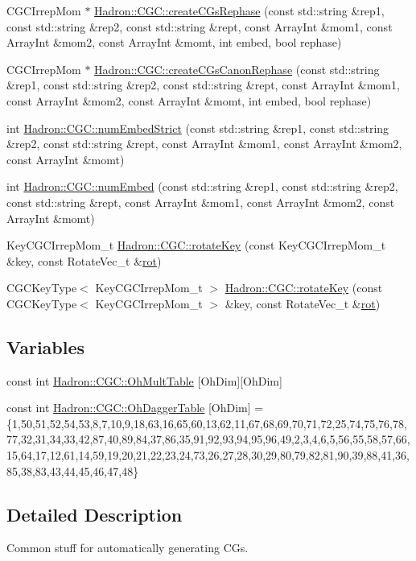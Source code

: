 \begin{DoxyCompactItemize}
\item 
C\+G\+C\+Irrep\+Mom $\ast$ \mbox{\hyperlink{namespaceHadron_1_1CGC_acb590dcbf6bd9f515f07a8e64aa76c0b}{Hadron\+::\+C\+G\+C\+::create\+C\+Gs\+Rephase}} (const std\+::string \&rep1, const std\+::string \&rep2, const std\+::string \&rept, const Array\+Int \&mom1, const Array\+Int \&mom2, const Array\+Int \&momt, int embed, bool rephase)
\item 
C\+G\+C\+Irrep\+Mom $\ast$ \mbox{\hyperlink{namespaceHadron_1_1CGC_a47b736ab1ac22edb39f4b0df589a7053}{Hadron\+::\+C\+G\+C\+::create\+C\+Gs\+Canon\+Rephase}} (const std\+::string \&rep1, const std\+::string \&rep2, const std\+::string \&rept, const Array\+Int \&mom1, const Array\+Int \&mom2, const Array\+Int \&momt, int embed, bool rephase)
\item 
int \mbox{\hyperlink{namespaceHadron_1_1CGC_af5aac6c0d70eb7159aa635525bac7629}{Hadron\+::\+C\+G\+C\+::num\+Embed\+Strict}} (const std\+::string \&rep1, const std\+::string \&rep2, const std\+::string \&rept, const Array\+Int \&mom1, const Array\+Int \&mom2, const Array\+Int \&momt)
\item 
int \mbox{\hyperlink{namespaceHadron_1_1CGC_af727ac6be27b471bc40b4696c2a29cdb}{Hadron\+::\+C\+G\+C\+::num\+Embed}} (const std\+::string \&rep1, const std\+::string \&rep2, const std\+::string \&rept, const Array\+Int \&mom1, const Array\+Int \&mom2, const Array\+Int \&momt)
\item 
Key\+C\+G\+C\+Irrep\+Mom\+\_\+t \mbox{\hyperlink{namespaceHadron_1_1CGC_acdc26e4dd88e281dc6675da8d6d1b13d}{Hadron\+::\+C\+G\+C\+::rotate\+Key}} (const Key\+C\+G\+C\+Irrep\+Mom\+\_\+t \&key, const Rotate\+Vec\+\_\+t \&\mbox{\hyperlink{rot__mat_8cc_a1db2ab3d82c6029ee441423308802a74}{rot}})
\item 
C\+G\+C\+Key\+Type$<$ Key\+C\+G\+C\+Irrep\+Mom\+\_\+t $>$ \mbox{\hyperlink{namespaceHadron_1_1CGC_ad5f1f6f8b8dd82238f3efeb03d1dc6e5}{Hadron\+::\+C\+G\+C\+::rotate\+Key}} (const C\+G\+C\+Key\+Type$<$ Key\+C\+G\+C\+Irrep\+Mom\+\_\+t $>$ \&key, const Rotate\+Vec\+\_\+t \&\mbox{\hyperlink{rot__mat_8cc_a1db2ab3d82c6029ee441423308802a74}{rot}})
\end{DoxyCompactItemize}
\subsection*{Variables}
\begin{DoxyCompactItemize}
\item 
const int \mbox{\hyperlink{namespaceHadron_1_1CGC_a1d8567cc768ec6fc24e3b51fbe4b024d}{Hadron\+::\+C\+G\+C\+::\+Oh\+Mult\+Table}} \mbox{[}Oh\+Dim\mbox{]}\mbox{[}Oh\+Dim\mbox{]}
\item 
const int \mbox{\hyperlink{namespaceHadron_1_1CGC_a1eb370ef84af334291e2488ffea2c979}{Hadron\+::\+C\+G\+C\+::\+Oh\+Dagger\+Table}} \mbox{[}Oh\+Dim\mbox{]} = \{1,50,51,52,54,53,8,7,10,9,18,63,16,65,60,13,62,11,67,68,69,70,71,72,25,74,75,76,78,77,32,31,34,33,42,87,40,89,84,37,86,35,91,92,93,94,95,96,49,2,3,4,6,5,56,55,58,57,66,15,64,17,12,61,14,59,19,20,21,22,23,24,73,26,27,28,30,29,80,79,82,81,90,39,88,41,36,85,38,83,43,44,45,46,47,48\}
\end{DoxyCompactItemize}


\subsection{Detailed Description}
Common stuff for automatically generating C\+Gs. 

